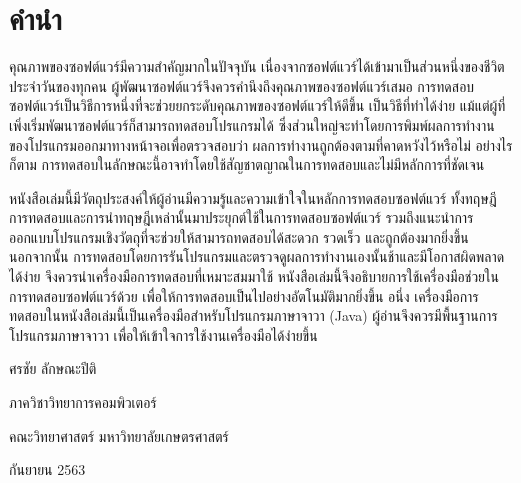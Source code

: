 \chapter*{คำนำ}

คุณภาพของซอฟต์แวร์มีความสำคัญมากในปัจจุบัน เนื่องจากซอฟต์แวร์ได้เข้ามาเป็นส่วนหนึ่งของชีวิตประจำวันของทุกคน ผู้พัฒนาซอฟต์แวร์จึงควรคำนึงถึงคุณภาพของซอฟต์แวร์เสมอ การทดสอบซอฟต์แวร์เป็นวิธีการหนึ่งที่จะช่วยยกระดับคุณภาพของซอฟต์แวร์ให้ดีขึ้น เป็นวิธีที่ทำได้ง่าย
แม้แต่ผู้ที่เพิ่งเริ่มพัฒนาซอฟต์แวร์ก็สามารถทดสอบโปรแกรมได้ ซึ่งส่วนใหญ่จะทำโดยการพิมพ์ผลการทำงานของโปรแกรมออกมาทางหน้าจอเพื่อตรวจสอบว่า ผลการทำงานถูกต้องตามที่คาดหวังไว้หรือไม่ อย่างไรก็ตาม การทดสอบในลักษณะนี้อาจทำโดยใช้สัญชาตญาณในการทดสอบและไม่มีหลักการที่ชัดเจน  

หนังสือเล่มนี้มีวัตถุประสงค์ให้ผู้อ่านมีความรู้และความเข้าใจในหลักการทดสอบซอฟต์แวร์ ทั้งทฤษฎีการทดสอบและการนำทฤษฎีเหล่านั้นมาประยุกต์ใช้ในการทดสอบซอฟต์แวร์ รวมถึงแนะนำการออกแบบโปรแกรมเชิงวัตถุที่จะช่วยให้สามารถทดสอบได้สะดวก รวดเร็ว และถูกต้องมากยิ่งขึ้น
นอกจากนั้น การทดสอบโดยการรันโปรแกรมและตรวจดูผลการทำงานเองนั้นช้าและมีโอกาสผิดพลาดได้ง่าย จึงควรนำเครื่องมือการทดสอบที่เหมาะสมมาใช้ หนังสือเล่มนี้จึงอธิบายการใช้เครื่องมือช่วยในการทดสอบซอฟต์แวร์ด้วย เพื่อให้การทดสอบเป็นไปอย่างอัตโนมัติมากยิ่งขึ้น อนึ่ง เครื่องมือการทดสอบในหนังสือเล่มนี้เป็นเครื่องมือสำหรับโปรแกรมภาษาจาวา (Java) ผู้อ่านจึงควรมีพื้นฐานการโปรแกรมภาษาจาวา เพื่อให้เข้าใจการใช้งานเครื่องมือได้ง่ายขึ้น


\hspace*{\fill} ศรชัย ลักษณะปีติ

\hspace*{\fill} ภาควิชาวิทยาการคอมพิวเตอร์ 

\hspace*{\fill} คณะวิทยาศาสตร์ มหาวิทยาลัยเกษตรศาสตร์ 

\hspace*{\fill} กันยายน 2563